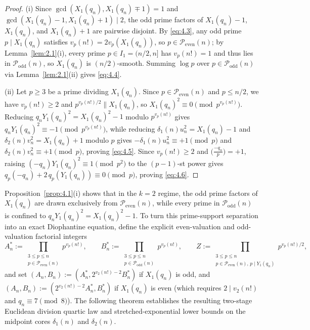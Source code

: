 \documentclass[11pt,reqno]{amsart}
\theoremstyle{remark}
\numberwithin{equation}{section}
\newcommand{\Podd}{\mathcal{P}_{\mathrm{odd}}}
\newcommand{\Peven}{\mathcal{P}_{\mathrm{even}}}
\begin{document}
\begin{proof}
(i) Since $\gcd(X_1(q_n), X_1(q_n) \mp 1) = 1$ and $\gcd(X_1(q_n) - 1, X_1(q_n) + 1) \mid 2$, the odd prime factors of $X_1(q_n) - 1$, $X_1(q_n)$, and $X_1(q_n) + 1$ are pairwise disjoint. By \eqref{eq:4.3}, any odd prime $p \mid X_1(q_n)$ satisfies $v_p(n!) = 2v_p(X_1(q_n))$, so $p \in \Peven(n)$; by Lemma~\ref{lem:2.1}(i), every prime $p \in I_1 = (n/2, n]$ has $v_p(n!) = 1$ and thus lies in $\Podd(n)$, so $X_1(q_n)$ is $(n/2)$-smooth. Summing $\log p$ over $p \in \Podd(n)$ via Lemma~\ref{lem:2.1}(ii) gives \eqref{eq:4.4}.

(ii) Let $p \ge 3$ be a prime dividing $X_1(q_n)$. Since $p \in \Peven(n)$ and $p \le n/2$, we have $v_p(n!) \ge 2$ and $p^{v_p(n!)/2} \parallel X_1(q_n)$, so $X_1(q_n)^2 \equiv 0 \pmod{p^{v_p(n!)}}$. Reducing $q_n Y_1(q_n)^2 = X_1(q_n)^2 - 1$ modulo $p^{v_p(n!)}$ gives $q_n Y_1(q_n)^2 \equiv -1 \pmod{p^{v_p(n!)}}$, while reducing $\delta_1(n)u_n^2 = X_1(q_n) - 1$ and $\delta_2(n)v_n^2 = X_1(q_n) + 1$ modulo $p$ gives $-\delta_1(n)u_n^2 \equiv +1 \pmod p$ and $\delta_2(n)v_n^2 \equiv +1 \pmod p$, proving \eqref{eq:4.5}. Since $v_p(n!) \ge 2$ and $\bigl(\frac{-q_n}{p}\bigr) = +1$, raising $(-q_n)Y_1(q_n)^2 \equiv 1 \pmod{p^2}$ to the $(p - 1)$-st power gives $q_p(-q_n) + 2\,q_p(Y_1(q_n)) \equiv 0 \pmod p$, proving \eqref{eq:4.6}.
\end{proof}

Proposition~\ref{prop:4.1}(i) shows that in the $k = 2$ regime, the odd prime factors of $X_1(q_n)$ are drawn exclusively from $\Peven(n)$, while every prime in $\Podd(n)$ is confined to $q_n Y_1(q_n)^2 = X_1(q_n)^2 - 1$. To turn this prime-support separation into an exact Diophantine equation, define the explicit even-valuation and odd-valuation factorial integers
\begin{equation}\label{eq:4.7}
A_n^* := \prod_{\substack{3 \le p \le n \\ p \in \Peven(n)}} p^{v_p(n!)}, \qquad B_n^* := \prod_{\substack{3 \le p \le n \\ p \in \Podd(n)}} p^{v_p(n!)}, \qquad Z := \prod_{\substack{3 \le p \le n \\ p \in \Peven(n),\, p \mid Y_1(q_n)}} p^{v_p(n!)/2},
\end{equation}
and set $(A_n, B_n) := (A_n^*, 2^{v_2(n!)-2} B_n^*)$ if $X_1(q_n)$ is odd, and $(A_n, B_n) := (2^{v_2(n!)-2} A_n^*, B_n^*)$ if $X_1(q_n)$ is even (which requires $2 \mid v_2(n!)$ and $q_n \equiv 7 \pmod 8$). The following theorem establishes the resulting two-stage Euclidean division quartic law and stretched-exponential lower bounds on the midpoint cores $\delta_1(n)$ and $\delta_2(n)$.
\end{document}
